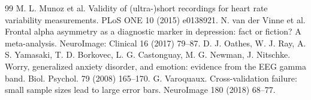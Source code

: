 \documentclass[10pt]{article}
\begin{document}
\begin{thebibliography}{99}
 M. L. Munoz et al. Validity of (ultra-)short recordings for heart rate variability measurements. PLoS ONE 10 (2015) e0138921.
 N. van der Vinne et al. Frontal alpha asymmetry as a diagnostic marker in depression: fact or fiction? A meta-analysis. NeuroImage: Clinical 16 (2017) 79--87.
 D. J. Oathes, W. J. Ray, A. S. Yamasaki, T. D. Borkovec, L. G. Castonguay, M. G. Newman, J. Nitschke. Worry, generalized anxiety disorder, and emotion: evidence from the EEG gamma band. Biol. Psychol. 79 (2008) 165--170.
 G. Varoquaux. Cross-validation failure: small sample sizes lead to large error bars. NeuroImage 180 (2018) 68--77.
\end{thebibliography}
\end{document}
